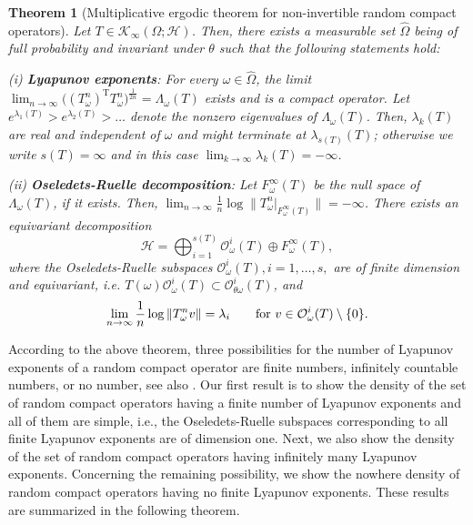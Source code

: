 \documentclass[pdflatex,sn-mathphys-num]{sn-jnl}%
\theoremstyle{thmstyleone}%
\newtheorem{theorem}{Theorem}%
\theoremstyle{thmstyletwo}%
\theoremstyle{thmstylethree}%
\newcommand{\rT}{\mathrm {T}}
\numberwithin{equation}{section}
\begin{document}
\begin{theorem}[Multiplicative ergodic theorem for non-invertible random compact  operators]\label{MET_HilbertSpace} Let $T\in \mathcal K_{\infty}(\Omega;\mathcal H)$. Then, there exists a measurable set $	\widehat \Omega$ being of full probability and invariant under $\theta$ such that the following statements hold:

\noindent 
(i) \textbf{Lyapunov exponents}: For every $\omega\in\widehat \Omega$, the limit $\lim_{n\to\infty} \big((T^n_{\omega})^{\rT} T^n_{\omega}\big)^{\frac{1}{2n}}=\Lambda_{\omega}(T)$ exists and is a compact operator. Let $e^{\lambda_1(T)}>e^{\lambda_2(T)}>\dots$ denote the nonzero eigenvalues of $\Lambda_{\omega}(T)$. Then, 
$\lambda_k(T)$ are real and independent of $\omega$ and might terminate at $\lambda_{s(T)}(T)$; otherwise we write $s(T)=\infty$  and in this case $\lim_{k\to\infty}\lambda_k(T)=-\infty$. 

\noindent (ii) \textbf{Oseledets-Ruelle decomposition}: Let $F^{\infty}_{\omega}(T)$ be the null space of $\Lambda_{\omega}(T)$, if it exists. Then, $
	\lim_{n\to\infty}\frac{1}{n}\log\|T^n_{\omega}|_{F_{\omega}^{\infty}(T)}\|=
		-\infty$. There exists an equivariant decomposition 
	\[
	\mathcal H=  \bigoplus_{i=1}^{s(T)} \mathcal O^i_{\omega}(T) \oplus F^{\infty}_{\omega}(T),
	\]
where the Oseledets-Ruelle subspaces $\mathcal O^i_{\omega}(T), i=1,\dots,s,$ are of finite dimension and equivariant, i.e. $T(\omega) \mathcal O^i_{\omega}(T)\subset \mathcal O^i_{\theta\omega}(T)$, and
	\[
	\lim_{n\to\infty}\frac{1}{n}\log\|T^n_{\omega}v\|=\lambda_i\qquad\hbox{for } v\in\mathcal O^i_{\omega}(T)\setminus\{0\}.
	\]
\end{theorem}
%
%
%
According to the above theorem, three possibilities for the number of Lyapunov exponents of a random compact operator are finite numbers, infinitely countable numbers, or no number, see also \cite{LianLu2010}. Our first result is to show the density of the set of random compact operators having a finite number of Lyapunov exponents and all of them are simple, i.e., the Oseledets-Ruelle subspaces corresponding to all finite Lyapunov exponents are of dimension one.  Next, we also show the density of the set of random compact operators having infinitely many Lyapunov exponents. Concerning the remaining possibility, we show the nowhere density of random compact operators having no finite Lyapunov exponents. These results are summarized in the following theorem.\\
%
%
\end{document}
